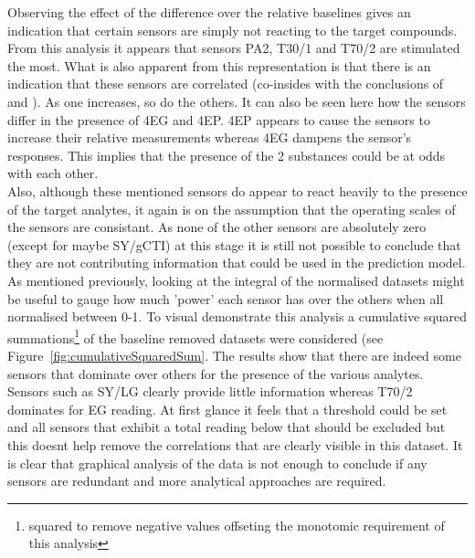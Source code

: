 \documentclass[twocolumn]{article}
\begin{document}
Observing the effect of the difference over the relative baselines gives an indication that certain sensors
are simply not reacting to the target compounds. From this analysis it appears that sensors PA2, T30/1 and T70/2
are stimulated the most. What is also apparent from this representation is that there is an indication that
these sensors are correlated (co-insides with the conclusions of \cite{wineSpoilage} and \cite{MOSAnalysis}). As one increases, so do the others. It can also be seen here how the sensors differ in
the presence of 4EG and 4EP. 4EP appears to cause the sensors to increase their relative measurements whereas 4EG
dampens the sensor's responses. This implies that the presence of the 2 substances could be at odds with each other.\\
Also, although these mentioned sensors do appear to react heavily to the presence of the target analytes, it again is 
on the assumption that the operating scales of the sensors are consistant. As none of the other sensors are absolutely zero 
(except for maybe SY/gCTI) at this stage it is still not possible to conclude that they are not contributing information that could be used in the prediction model. As mentioned
previously, looking at the integral of the normalised datasets might be useful to gauge how much 'power' each sensor has over the others
when all normalised between 0-1. To visual demonstrate this analysis a cumulative squared summations\footnote{squared to remove negative values offseting 
the monotomic requirement of this analysis} of the baseline removed datasets were considered (see Figure~\ref{fig:cumulativeSquaredSum}. 
The results show that there are indeed some sensors that dominate over others for the presence of the various analytes. Sensors such as SY/LG 
clearly provide little information whereas T70/2 dominates for EG reading. At first glance it feels that a threshold could be set and all
sensors that exhibit a total reading below that should be excluded but this doesnt help remove the correlations that are clearly visible
in this dataset. It is clear that graphical analysis of the data is not enough to conclude if any sensors are redundant and more analytical 
approaches are required.
\end{document}
